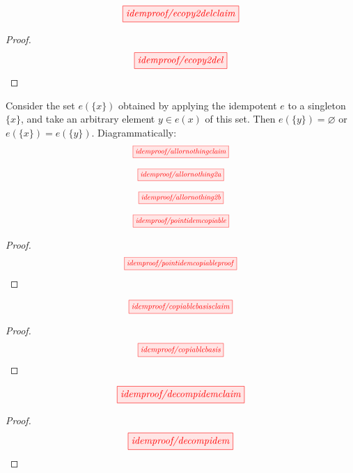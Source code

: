 \begin{myboxR}
\begin{proposition}\label{prop:counitdelete}
\[\scalebox{1}{\tikzfig{idemproof/ecopy2delclaim}}\]
\begin{proof}
\[\scalebox{1}{\tikzfig{idemproof/ecopy2del}}\]
\end{proof}
\end{proposition}
\end{myboxR}

\begin{myboxB}
\begin{lemma}\label{lem:allornothing}
Consider the set $e(\{x\})$ obtained by applying the idempotent $e$ to a singleton $\{x\}$, and take an arbitrary element $y \in e(x)$ of this set. Then $e(\{y\}) = \varnothing$ or $e(\{x\}) = e(\{y\})$. Diagrammatically: \[\scalebox{0.75}{\tikzfig{idemproof/allornothingclaim}}\]
\end{lemma}
\[\scalebox{0.75}{\tikzfig{idemproof/allornothing2a}}\]
\end{myboxB}
\begin{myboxB}
\[\scalebox{0.75}{\tikzfig{idemproof/allornothing2b}}\]
\end{myboxB}

\begin{myboxR}
\begin{proposition}\label{prop:epointcopy}
\[\scalebox{0.75}{\tikzfig{idemproof/pointidemcopiable}}\]
\begin{proof}
\[\scalebox{0.75}{\tikzfig{idemproof/pointidemcopiableproof}}\]
\end{proof}
\end{proposition}
\end{myboxR}

\begin{myboxB}
\begin{proposition}\label{prop:copiablebasis}
\[\scalebox{0.8}{\tikzfig{idemproof/copiablebasisclaim}}\]
\begin{proof}
\[\scalebox{0.8}{\tikzfig{idemproof/copiablebasis}}\]
\end{proof}
\end{proposition}
\end{myboxB}

\begin{myboxR}
\begin{proposition}\label{prop:decompidem}
\[\scalebox{1}{\tikzfig{idemproof/decompidemclaim}}\]
\begin{proof}
\[\scalebox{1}{\tikzfig{idemproof/decompidem}}\]
\end{proof}
\end{proposition}
\end{myboxR}

